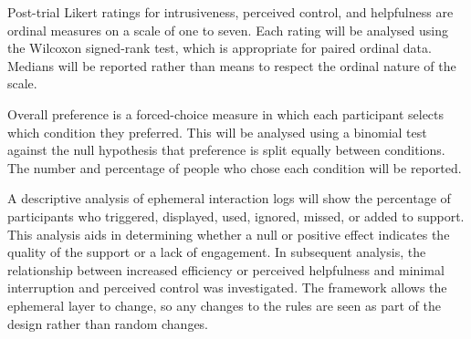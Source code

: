 Post-trial Likert ratings for intrusiveness, perceived control, and helpfulness are ordinal measures on a scale of one to seven. Each rating will be analysed using the Wilcoxon signed-rank test, which is appropriate for paired ordinal data. Medians will be reported rather than means to respect the ordinal nature of the scale.

Overall preference is a forced-choice measure in which each participant selects which condition they preferred. This will be analysed using a binomial test against the null hypothesis that preference is split equally between conditions. The number and percentage of people who chose each condition will be reported.

A descriptive analysis of ephemeral interaction logs will show the percentage of participants who triggered, displayed, used, ignored, missed, or added to support. This analysis aids in determining whether a null or positive effect indicates the quality of the support or a lack of engagement. In subsequent analysis, the relationship between increased efficiency or perceived helpfulness and minimal interruption and perceived control was investigated. The framework allows the ephemeral layer to change, so any changes to the rules are seen as part of the design rather than random changes.
